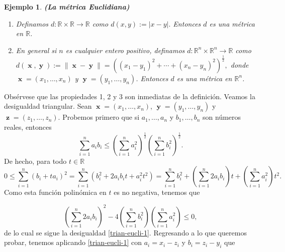 \documentclass[x11names, 12pt]{book}
\newtheorem{example}{Ejemplo}
\DeclareMathOperator{\y}{\textbf{y}}
\DeclareMathOperator{\z}{\textbf{z}}
\DeclareMathOperator{\x}{\textbf{x}}
\begin{document}
\begin{example}\textbf{(La métrica Euclidiana)}
\begin{enumerate}
    \item Definamos $d: \mathbb{R}\times \mathbb{R} \to \mathbb{R}$ como $d(x,y):= |x-y|.$ Entonces $d$ es una métrica en $\mathbb{R}$.
    \item En general si $n$ es cualquier  entero positivo, definamos $d: \mathbb{R}^n\times \mathbb{R}^n \to \mathbb{R}$ como \linebreak $d(\x,\y):= \|\x-\y \|=\left( (x_1-y_1)^2+\cdots + (x_n-y_n)^2\right)^{\frac{1}2},$ donde $\x=(x_1, \dots ,x_n)$ y $\y=(y_1, \dots ,y_n)$. Entonces $d$ es una métrica en $\mathbb{R}^n$.
\end{enumerate}
\end{example}
Obsérvese que las propiedades 1, 2 y 3
 son inmediatas de la definición. Veamos la desigualdad triangular. Sean $\x=(x_1, \dots ,x_n)$, $\y=(y_1, \dots ,y_n)$ y $\z=(z_1, \dots ,z_n)$. Probemos primero que si $a_1, \dots , a_n$ y $b_1, \dots , b_n$ son números reales, entonces
\begin{equation}\label{trian-eucli-1}
     \sum_{i=1}^na_ib_i \leq \left( \sum_{i=1}^na_i^2\right)^{\frac{1}{2}}\left( \sum_{i=1}^nb_i^2\right)^{\frac{1}{2}} .
 \end{equation}
De hecho, para todo $t\in \mathbb{R}$
\[0\leq \sum_{i=1}^n \left(b_i+ta_i\right)^2=\sum_{i=1}^n \left(b_i^2+2a_ib_it+a_i^2t^2\right)=\sum_{i=1}^n b_i^2+ \left(\sum_{i=1}^n 2a_ib_i\right)t+\left(\sum_{i=1}^n a_i^2\right)t^2.\]
Como esta función polinómica en $t$ es no negativa, tenemos que

\[\left(\sum_{i=1}^n 2a_ib_i\right)^2-4\left(\sum_{i=1}^n b_i^2\right)\left(\sum_{i=1}^n a_i^2\right) \leq 0,\]
de lo cual se sigue la desigualdad \eqref{trian-eucli-1}. Regresando a lo que queremos probar, tenemos aplicando \eqref{trian-eucli-1} con $a_i=x_i-z_i$ y $b_i=z_i-y_i$ que
\end{document}
